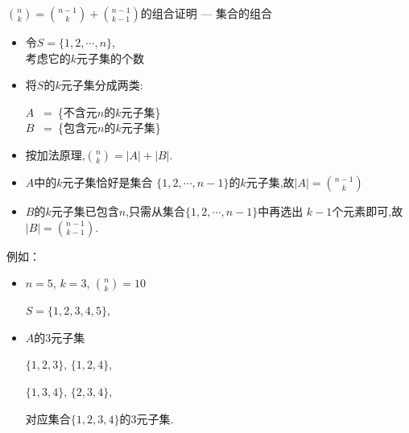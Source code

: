 \documentclass[punct]{ctexbeamer}
\begin{document}
\begin{frame}{$\binom{n}{k}=\binom{n-1}{k}+\binom{n-1}{k-1}$的组合证明 --- 集合的组合}


    \begin{minipage}{0.49\linewidth}
        \begin{itemize}
            \item 令$S=\{1,2,\cdots,n\}$,\\
            考虑它的$k$元子集的个数

            \item 将$S$的$k$元子集分成两类:
            \begin{center}
                $A$ \, =\, \{不含元$n$的$k$元子集\} \\
                $B$ \, =\, \{包含元$n$的$k$元子集\}
            \end{center}
            \item  按加法原理,$\binom{n}{k}=|A|+|B|$.

            \item $A$中的$k$元子集恰好是集合 $\{1,2,\cdots,n-1\}$的$k$元子集,故$|A|=\binom{n-1}{k}$


            \item  $B$的$k$元子集已包含$n$,只需从集合$\{1,2,\cdots,n-1\}$中再选出 $k-1$个元素即可,故$|B|=\binom{n-1}{k-1}.$
        \end{itemize}
    \end{minipage}
    \begin{minipage}{0.49\linewidth}
        \begin{flushleft}
            \quad 例如：

            \begin{itemize}
                \item  $n=5$, $k=3$, $\binom{n}{k}=10$

                $S=\{1,2,3,4,5\}$,




                \item

                \small{$A$的3元子集

                    \begin{center}
                        $\{1,2,3\}$, $\{1,2,4\}$,

                        $\{1,3,4\}$, $\{2,3,4\}$,
                    \end{center}

                    对应集合$\{1,2,3,4\}$的3元子集.}



\end{itemize}
\end{flushleft}
\end{minipage}
\end{frame}
\end{document}
